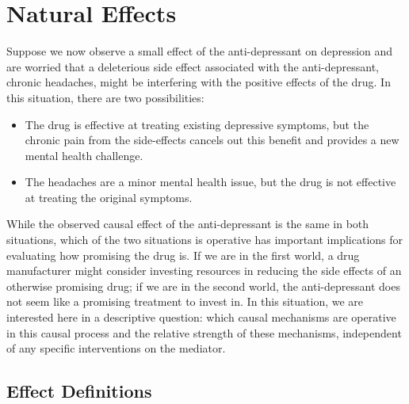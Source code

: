 \chapter{Natural Effects}\label{chapter:natural_effects}

Suppose we now observe a small effect of the anti-depressant on depression and are worried 
that a deleterious side effect associated with the anti-depressant, chronic headaches, might be interfering 
with the positive effects of the drug. In this situation, there are two possibilities: 

\begin{itemize}[noitemsep,topsep=0pt]
	\item The drug is effective at treating existing depressive symptoms, but the chronic pain from the side-effects 
	cancels out this benefit and provides a new mental health challenge.
	\item The headaches are a minor mental health issue, but the drug is not effective at treating the original 
	symptoms. 
\end{itemize}

While the observed causal effect of the anti-depressant is the same in both situations, which of the two situations is 
operative has important implications for evaluating how promising the drug is. If we are in the first world,
a drug manufacturer might consider investing resources in reducing the side effects of an otherwise promising drug;
if we are in the second world, the anti-depressant does not seem like a promising treatment to invest in. In this 
situation, we are interested here in a descriptive question: which causal mechanisms are operative in this causal 
process and the relative strength of these mechanisms, independent of any specific interventions on the mediator.


\section{Effect Definitions}\label{subsection:natural_effect_defs}


